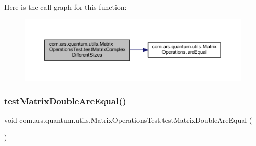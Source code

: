 Here is the call graph for this function\+:\nopagebreak
\begin{figure}[H]
\begin{center}
\leavevmode
\includegraphics[width=350pt]{classcom_1_1ars_1_1quantum_1_1utils_1_1_matrix_operations_test_a2067fc7495133c6604494ae61c0b21f5_cgraph}
\end{center}
\end{figure}
\hypertarget{classcom_1_1ars_1_1quantum_1_1utils_1_1_matrix_operations_test_a8cc1964185da3b73b5a1f4f38f0bb25d}{}\label{classcom_1_1ars_1_1quantum_1_1utils_1_1_matrix_operations_test_a8cc1964185da3b73b5a1f4f38f0bb25d} 
\subsubsection{\texorpdfstring{test\+Matrix\+Double\+Are\+Equal()}{testMatrixDoubleAreEqual()}}
{\footnotesize\ttfamily void com.\+ars.\+quantum.\+utils.\+Matrix\+Operations\+Test.\+test\+Matrix\+Double\+Are\+Equal (\begin{DoxyParamCaption}{ }\end{DoxyParamCaption})}

